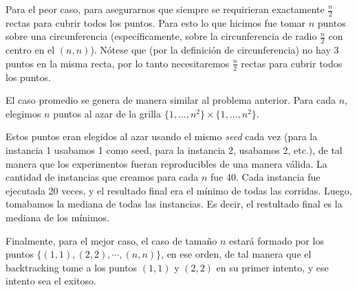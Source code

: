 Para el peor caso, para asegurarnos que siempre se requirieran exactamente $\frac{n}{2}$ rectas para cubrir todos los puntos. Para esto lo que hicimos fue tomar $n$ puntos sobre una circunferencia (específicamente, sobre la circunferencia de radio $\frac{n}{2}$ con centro en el $(n,n)$). Nótese que (por la definición de circunferencia) no hay 3 puntos en la misma recta, por lo tanto necesitaremos $\frac{n}{2}$ rectas para cubrir todos los puntos.

El caso promedio se genera de manera similar al problema anterior. Para cada $n$, elegimos $n$ puntos al azar de la grilla $\{1,..., n^2\} \times \{1, ... , n^2\}$.

Estos puntos eran elegidos al azar usando el mismo \emph{seed} cada vez (para la instancia 1 usabamos 1 como seed, para la instancia 2, usabamos 2, etc.), de tal manera que los experimentos fueran reproducibles de una manera válida.
La cantidad de instancias que creamos para cada $n$ fue 40.
Cada instancia fue ejecutada 20 veces, y el resultado final era el mínimo de todas las corridas.
Luego, tomabamos la mediana de todas las instancias. Es decir, el restultado final es la mediana de los mínimos.

Finalmente, para el mejor caso, el caso de tamaño $n$ estará formado por los puntos $\{(1,1), (2,2), \cdots, (n, n)\}$, en ese orden, de tal manera que el backtracking tome a los puntos $(1,1)$ y $(2,2)$ en su primer intento, y ese intento sea el exitoso.
